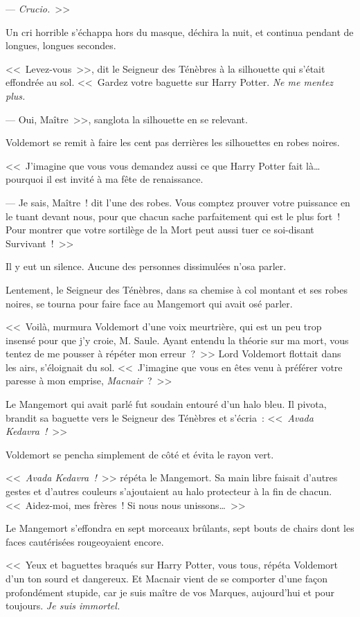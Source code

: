 --- \emph{Crucio.}~>>

Un cri horrible s'échappa hors du masque, déchira la nuit, et continua pendant de longues, longues secondes.

<<~Levez-vous~>>, dit le Seigneur des Ténèbres à la silhouette qui s'était effondrée au sol. <<~Gardez votre baguette sur Harry Potter. \emph{Ne me mentez plus.}

--- Oui, Maître~>>, sanglota la silhouette en se relevant.

Voldemort se remit à faire les cent pas derrières les silhouettes en robes noires.

<<~J'imagine que vous vous demandez aussi ce que Harry Potter fait là… pourquoi il est invité à ma fête de renaissance.

--- Je sais, Maître~! dit l'une des robes. Vous comptez prouver votre puissance en le tuant devant nous, pour que chacun sache parfaitement qui est le plus fort~! Pour montrer que votre sortilège de la Mort peut aussi tuer ce soi-disant Survivant~!~>>

Il y eut un silence. Aucune des personnes dissimulées n'osa parler.

Lentement, le Seigneur des Ténèbres, dans sa chemise à col montant et ses robes noires, se tourna pour faire face au Mangemort qui avait osé parler.

<<~Voilà, murmura Voldemort d'une voix meurtrière, qui est un peu trop insensé pour que j'y croie, M. Saule. Ayant entendu la théorie sur ma mort, vous tentez de me pousser à répéter mon erreur~?~>> Lord Voldemort flottait dans les airs, s'éloignait du sol. <<~J'imagine que vous en êtes venu à préférer votre paresse à mon emprise, \emph{Macnair}~?~>>

Le Mangemort qui avait parlé fut soudain entouré d'un halo bleu. Il pivota, brandit sa baguette vers le Seigneur des Ténèbres et s'écria~: <<~\emph{Avada Kedavra~!}~>>

Voldemort se pencha simplement de côté et évita le rayon vert.

<<~\emph{Avada Kedavra~!}~>> répéta le Mangemort. Sa main libre faisait d'autres gestes et d'autres couleurs s'ajoutaient au halo protecteur à la fin de chacun. <<~Aidez-moi, mes frères~! Si nous nous unissons…~>>

Le Mangemort s'effondra en sept morceaux brûlants, sept bouts de chairs dont les faces cautérisées rougeoyaient encore.

<<~Yeux et baguettes braqués sur Harry Potter, vous tous, répéta Voldemort d'un ton sourd et dangereux. Et Macnair vient de se comporter d'une façon profondément stupide, car je suis maître de vos Marques, aujourd'hui et pour toujours. \emph{Je suis immortel.}

